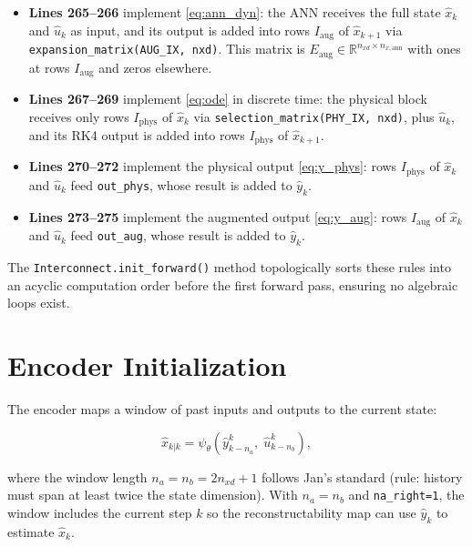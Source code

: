 \documentclass[11pt,a4paper]{article}
\newcommand{\code}[1]{\texttt{#1}}
\begin{document}
\begin{itemize}
  \item \textbf{Lines 265--266} implement \eqref{eq:ann_dyn}:
    the ANN receives the full state $\hat{x}_k$ and $\hat{u}_k$ as input,
    and its output is added into rows $I_{\mathrm{aug}}$ of $\hat{x}_{k+1}$
    via \code{expansion\_matrix(AUG\_IX, nxd)}.
    This matrix is $E_{\mathrm{aug}} \in \mathbb{R}^{n_{xd} \times n_{x,\mathrm{ann}}}$
    with ones at rows $I_{\mathrm{aug}}$ and zeros elsewhere.

  \item \textbf{Lines 267--269} implement \eqref{eq:ode} in discrete time:
    the physical block receives only rows $I_{\mathrm{phys}}$ of $\hat{x}_k$
    via \code{selection\_matrix(PHY\_IX, nxd)}, plus $\hat{u}_k$,
    and its RK4 output is added into rows $I_{\mathrm{phys}}$ of $\hat{x}_{k+1}$.

  \item \textbf{Lines 270--272} implement the physical output \eqref{eq:y_phys}:
    rows $I_{\mathrm{phys}}$ of $\hat{x}_k$ and $\hat{u}_k$ feed
    \code{out\_phys}, whose result is added to $\hat{y}_k$.

  \item \textbf{Lines 273--275} implement the augmented output \eqref{eq:y_aug}:
    rows $I_{\mathrm{aug}}$ of $\hat{x}_k$ and $\hat{u}_k$ feed
    \code{out\_aug}, whose result is added to $\hat{y}_k$.
\end{itemize}

The \code{Interconnect.init\_forward()} method topologically sorts these
rules into an acyclic computation order before the first forward pass,
ensuring no algebraic loops exist.

\section{Encoder Initialization}
\label{sec:encoder}

The encoder maps a window of past inputs and outputs to the current state:

\begin{equation}
  \hat{x}_{k|k} = \psi_\theta\!\left(
    \hat{y}_{k-n_a}^{k},\;
    \hat{u}_{k-n_b}^{k}
  \right),
  \label{eq:encoder}
\end{equation}

where the window length $n_a = n_b = 2 n_{xd} + 1$ follows Jan's standard
(rule: history must span at least twice the state dimension).
With $n_a = n_b$ and \code{na\_right=1}, the window includes the current
step $k$ so the reconstructability map can use $\hat{y}_k$ to estimate $\hat{x}_k$.
\end{document}
